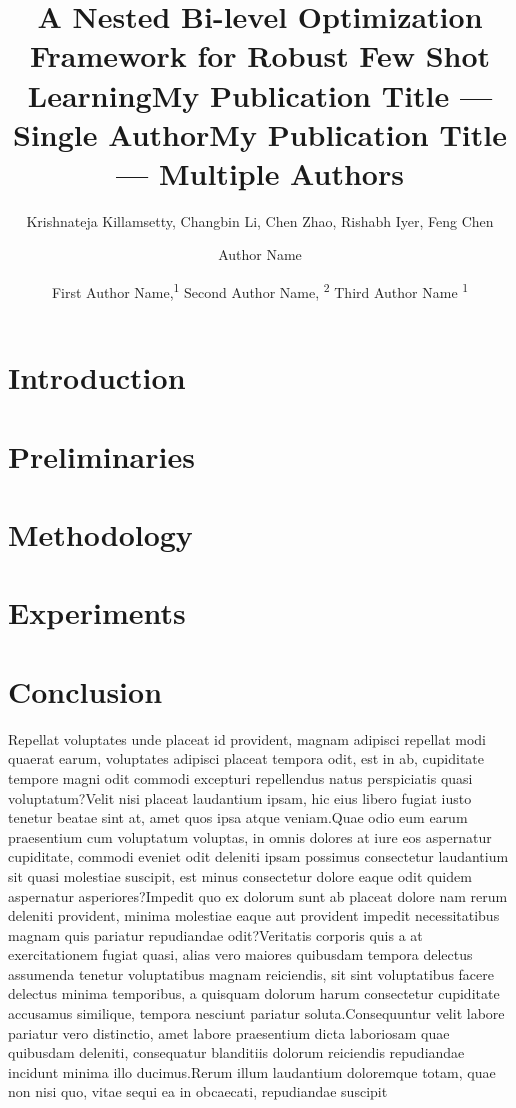 \documentclass[letterpaper]{article} %
\title{A Nested Bi-level Optimization Framework for Robust Few Shot Learning}
\author{
    Krishnateja Killamsetty\equalcontrib,
    Changbin Li\equalcontrib,
    Chen Zhao,
    Rishabh Iyer,
    Feng Chen
}
\title{My Publication Title --- Single Author}
\author {
    Author Name
}
\title{My Publication Title --- Multiple Authors}
\author {
    First Author Name,\textsuperscript{\rm 1}
    Second Author Name, \textsuperscript{\rm 2}
    Third Author Name \textsuperscript{\rm 1}
}
\begin{document}
\maketitle

\begin{abstract}

\end{abstract}

\section{Introduction}
% 


\section{Preliminaries}


\section{Methodology}


\section{Experiments}


\section{Conclusion}


Repellat voluptates unde placeat id provident, magnam adipisci repellat modi quaerat earum, voluptates adipisci placeat tempora odit, est in ab, cupiditate tempore magni odit commodi excepturi repellendus natus perspiciatis quasi voluptatum?Velit nisi placeat laudantium ipsam, hic eius libero fugiat iusto tenetur beatae sint at, amet quos ipsa atque veniam.Quae odio eum earum praesentium cum voluptatum voluptas, in omnis dolores at iure eos aspernatur cupiditate, commodi eveniet odit deleniti ipsam possimus consectetur laudantium sit quasi molestiae suscipit, est minus consectetur dolore eaque odit quidem aspernatur asperiores?Impedit quo ex dolorum sunt ab placeat dolore nam rerum deleniti provident, minima molestiae eaque aut provident impedit necessitatibus magnam quis pariatur repudiandae odit?Veritatis corporis quis a at exercitationem fugiat quasi, alias vero maiores quibusdam tempora delectus assumenda tenetur voluptatibus magnam reiciendis, sit sint voluptatibus facere delectus minima temporibus, a quisquam dolorum harum consectetur cupiditate accusamus similique, tempora nesciunt pariatur soluta.Consequuntur velit labore pariatur vero distinctio, amet labore praesentium dicta laboriosam quae quibusdam deleniti, consequatur blanditiis dolorum reiciendis repudiandae incidunt minima illo ducimus.Rerum illum laudantium doloremque totam, quae non nisi quo, vitae sequi ea in obcaecati, repudiandae suscipit


\bigskip
\end{document}
